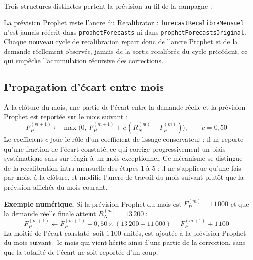 \documentclass[11pt,a4paper]{article}
\newcommand{\code}[1]{\texttt{#1}}
\begin{document}
Trois structures distinctes portent la prévision au fil de la campagne :
\begin{center}
\end{center}
La prévision Prophet reste l'ancre du Recalibrator : \code{forecastRecalibreMensuel} n'est jamais réécrit dans \code{prophetForecasts} ni dans \code{prophetForecastsOriginal}. Chaque nouveau cycle de recalibration repart donc de l'ancre Prophet et de la demande réellement observée, jamais de la sortie recalibrée du cycle précédent, ce qui empêche l'accumulation récursive des corrections.

\subsection{Propagation d'écart entre mois}

À la clôture du mois, une partie de l'écart entre la demande réelle et la prévision Prophet est reportée sur le mois suivant :
\[
F_P^{(m+1)} \leftarrow \max\big(0,\ F_P^{(m+1)} + c\,(R_N^{(m)} - F_P^{(m)})\big), \qquad c = 0{,}50
\]
Le coefficient \(c\) joue le rôle d'un coefficient de lissage conservateur : il ne reporte qu'une fraction de l'écart constaté, ce qui corrige progressivement un biais systématique sans sur-réagir à un mois exceptionnel. Ce mécanisme se distingue de la recalibration intra-mensuelle des étapes 1 à 5 : il ne s'applique qu'une fois par mois, à la clôture, et modifie l'ancre de travail du mois suivant plutôt que la prévision affichée du mois courant.

\textbf{Exemple numérique.} Si la prévision Prophet du mois est \(F_P^{(m)}=11\,000\) et que la demande réelle finale atteint \(R_N^{(m)}=13\,200\) :
\[
F_P^{(m+1)} \leftarrow F_P^{(m+1)} + 0{,}50\times(13\,200 - 11\,000) = F_P^{(m+1)} + 1\,100
\]
La moitié de l'écart constaté, soit 1\,100 unités, est ajoutée à la prévision Prophet du mois suivant : le mois qui vient hérite ainsi d'une partie de la correction, sans que la totalité de l'écart ne soit reportée d'un coup.
\end{document}
